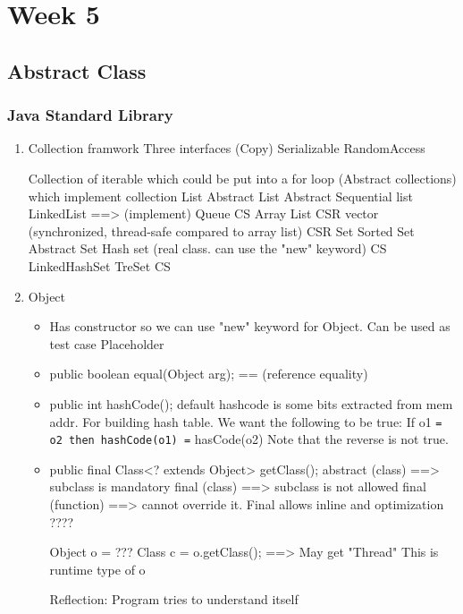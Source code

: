 \documentclass[11pt]{article}
\begin{document}
\section{Week 5}
\label{sec:orgba48538}

\subsection{Abstract Class}
\label{sec:org225327e}

\subsubsection{Java Standard Library}
\label{sec:orga4f52a6}
\begin{enumerate}
\item Collection framwork
Three interfaces
  (Copy)
  Serializable
  RandomAccess

Collection of iterable which could be put into a for loop
  (Abstract collections) which implement collection
  List
    Abstract List
      Abstract Sequential list
	LinkedList  ==> (implement) Queue CS
	Array List CSR
	vector (synchronized, thread-safe compared to array list) CSR
  Set 
    Sorted Set
    Abstract Set 
      Hash set (real class. can use the "new" keyword) CS
	LinkedHashSet
      TreSet CS

\item Object
\begin{itemize}
\item Has constructor 
so we can use "new" keyword for Object.
Can be used as test case
Placeholder

\item public boolean equal(Object arg);  == (reference equality)

\item public int hashCode();  default hashcode is some bits extracted from mem addr.
For building hash table.
We want the following to be true:
If o1 \texttt{= o2 then hashCode(o1) =} hasCode(o2)
Note that the reverse is not true.

\item public final Class<? extends Object> getClass(); 
abstract (class) ==> subclass is mandatory
final (class) ==> subclass is not allowed
final (function) ==> cannot override it.
Final allows inline and optimization ????

Object o = ???
Class c = o.getClass(); ==> May get "Thread"
This is runtime type of o

Reflection:
Program tries to understand itself


\end{itemize}
\end{enumerate}
\end{document}
